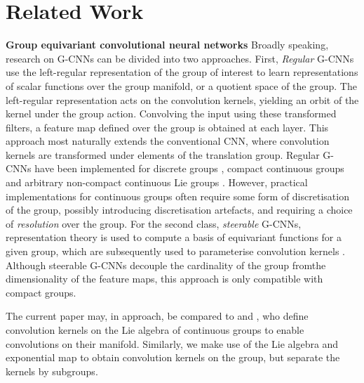 \documentclass[nohyperref]{article}
\theoremstyle{plain}
\theoremstyle{definition}
\theoremstyle{remark}
\begin{document}
\section{Related Work}
\textbf{Group equivariant convolutional neural networks} Broadly speaking, research on G-CNNs can be divided into two approaches. First, \textit{Regular} G-CNNs use the left-regular representation of the group of interest to learn representations of scalar functions over the group manifold, or a quotient space of the group. The left-regular representation acts on the convolution kernels, yielding an orbit of the kernel under the group action. Convolving the input using these transformed filters, a feature map defined over the group is obtained at each layer. This approach most naturally extends the conventional CNN, where convolution kernels are transformed under elements of the translation group. Regular G-CNNs have been implemented for discrete groups \citep{cohen2016group, winkels20183d, worrall2018cubenet}, compact continuous groups \citep{marcos2017rotation, bekkers2018roto} and arbitrary non-compact continuous Lie groups \citep{bekkers2019b, finzi2020generalizing, romero2020wavelet}. However, practical implementations for continuous groups often require some form of discretisation of the group, possibly introducing discretisation artefacts, and requiring a choice of \textit{resolution} over the group. For the second class, \textit{steerable} G-CNNs, representation theory is used to compute a basis of equivariant functions for a given group, which are subsequently used to parameterise convolution kernels \citep{cohen2016steerable, weiler20183d, weiler2018learning, sosnovik2019scale, sosnovik2021disco}. Although steerable G-CNNs decouple the cardinality of the group from\break the dimensionality of the feature maps, this approach is only compatible with compact groups.

The current paper may, in approach, be compared to \citet{bekkers2019b} and \citet{ finzi2020generalizing}, who define convolution kernels on the Lie algebra of continuous groups to enable convolutions on their manifold. Similarly, we make use of the Lie algebra and exponential map to obtain convolution kernels on the group, but separate the kernels by subgroups.
\end{document}

